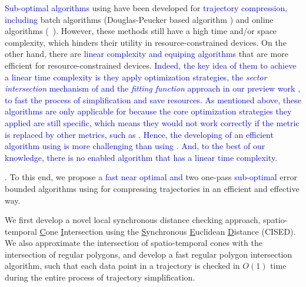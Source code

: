 \textcolor{blue}{Sub-optimal \lsa algorithms} using \sed have been developed for \textcolor{blue}{trajectory compression, including} batch algorithms (\eg Douglas-Peucker based algorithm \dpsed \cite{Meratnia:Spatiotemporal}) and online algorithms (\eg\ \squishe \cite{Muckell:Compression}).
However, these methods still have a high time and/or space complexity, which hinders their utility in resource-constrained devices. %
%
On the other hand, there are \textcolor{blue}{linear complexity and \ped equiping \lsa algorithms} \cite{Williams:Longest, Sklansky:Cone, Dunham:Cone, Zhao:Sleeve, Lin:Operb} that are more efficient for resource-constrained devices. 
%
\textcolor{blue}{Indeed, the key idea of them to achieve a linear time complexity is they apply optimization strategies, \eg the \textit{sector intersection} mechanism of \cite{Williams:Longest, Sklansky:Cone, Dunham:Cone, Zhao:Sleeve} and the \textit{fitting function} approach in our preview work \cite {Lin:Operb}, to fast the process of simplification and save resources. 
As mentioned above, these algorithms are only applicable for \ped because the core optimization strategies they applied are still \ped specific, which means they would not work correctly if the \ped metric is replaced by other metrics, such as \sed.} 
\textcolor{blue}{Hence, {the developing of an efficient \lsa algorithm using \sed is more challenging than using \ped}.}
\textcolor{blue}{And, to the best of our knowledge, there is no \sed enabled \lsa algorithm that has a linear time complexity.}





.
To this end, we propose \textcolor{blue}{ a fast near optimal and} two one-pass \textcolor{blue}{sub-optimal} error bounded \lsa algorithms using \sed for compressing trajectories in an efficient and effective way. %

 We first develop a novel local synchronous distance checking approach, \ie spatio-temporal \underline{C}one \underline{I}ntersection using the \underline{S}ynchronous \underline{E}uclidean \underline{D}istance (CISED).
We also approximate the intersection of spatio-temporal cones with the intersection of regular polygons, and develop a fast regular polygon intersection algorithm, such that each data point in a trajectory is checked in $O(1)$ time during the entire process of trajectory simplification.

